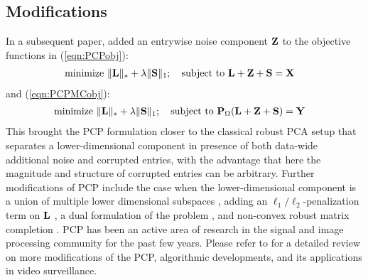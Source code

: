 \subsection*{\sffamily \large Modifications}
In a subsequent paper, \cite{ZhouEtal10} added an entrywise noise component ${\mathbf{Z}}$ to the objective functions in (\ref{eqn:PCPobj}):
%
\begin{align}\label{eqn:PCPobjZ}
& \text{minimize } \| {\mathbf{L}} \|_* + \lambda \| {\mathbf{S}} \|_1; \quad \text{subject to } {\mathbf{L}} + {\mathbf{Z}} + {\mathbf{S}} = {\mathbf{X}}
\end{align}
%
and (\ref{eqn:PCPMCobj}):
%
\begin{align}\label{eqn:PCPMCobjZ}
& \text{minimize } \| {\mathbf{L}} \|_* + \lambda \| {\mathbf{S}} \|_1; \quad \text{subject to } {\mathbf{P}}_\Omega({\mathbf{L}} + {\mathbf{Z}} + {\mathbf{S}}) = {\mathbf{Y}}
\end{align}
%
This brought the PCP formulation closer to the classical robust PCA setup that separates a lower-dimensional component in presence of both data-wide additional noise and corrupted entries, with the advantage that here the magnitude and structure of corrupted entries can be arbitrary. Further modifications of PCP include the case when the lower-dimensional component is a union of multiple lower dimensional subspaces \citep{WohlbergEtal12}, adding an $\ell_1/\ell_2$-penalization term on ${\mathbf{L}}$ \citep{TangNehorai11}, a dual formulation of the problem \citep{BeckerEtal11}, and non-convex robust matrix completion \citep{ShangEtal14}. PCP has been an active area of research in the signal and image processing community for the past few years. Please refer to \cite{Bouwmans14} for a detailed review on more modifications of the PCP, algorithmic developments, and its applications in video surveillance.